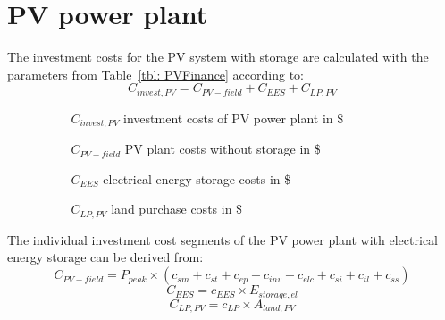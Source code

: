 \documentclass[Master,MEE,english]{twbook}%
\begin{document}
\section{PV power plant}
The investment costs for the PV system with storage are calculated with the parameters from Table~\ref{tbl: PVFinance} according to:
\begin{equation}
C_{invest,PV} = C_{PV-field}+C_{EES}+C_{LP,PV}
\end{equation} 
\begin{itemize}
\item[ ] 
\begin{itemize}
\item[ ] 
\begin{itemize}
\item[$C_{invest,PV}$]investment costs of PV power plant in \$
\item[$C_{PV-field}$]PV plant costs without storage in \$
\item[$C_{EES}$]electrical energy storage costs in \$
\item[$C_{LP,PV}$]land purchase costs in \$
\end{itemize}
\end{itemize}
\end{itemize}
The individual investment cost segments of the PV power plant with electrical energy storage can be derived from:
\begin{equation}
C_{PV-field} = P_{peak} \times (c_{sm}+c_{st}+c_{ep}+c_{inv}+c_{elc}+c_{si}+c_{tl}+c_{ss})
\end{equation} 
\begin{equation}
C_{EES} = c_{EES} \times E_{storage,el}
\end{equation}
\begin{equation}
C_{LP,PV} = c_{LP}\times A_{land,PV}
\end{equation} 
\end{document}
